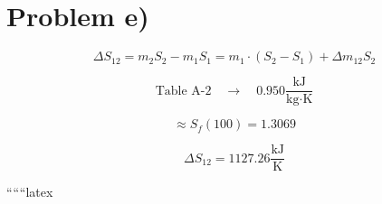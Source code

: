 \section*{Problem e)}

\[
\Delta S_{12} = m_2 S_2 - m_1 S_1 = m_1 \cdot (S_2 - S_1) + \Delta m_{12} S_2
\]

\[
\text{Table A-2} \quad \rightarrow \quad 0.950 \frac{\text{kJ}}{\text{kg} \cdot \text{K}}
\]

\[
\approx S_f(100) = 1.3069
\]

\[
\Delta S_{12} = 1127.26 \frac{\text{kJ}}{\text{K}}
\]

``````latex